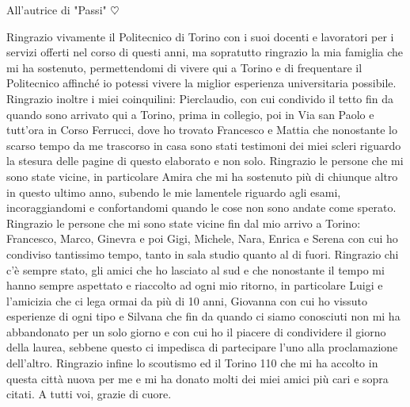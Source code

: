 \documentclass[%
	corpo=11pt,
    twoside,
    stile=classica,
    oldstyle,
    tipotesi=custom,
    greek,
    evenboxes,
]{toptesi}
\theoremstyle{plain}
\begin{document}


\ifclassica%
\begin{dedica}

    All'autrice di "Passi" $\heartsuit$\ %
\end{dedica}

\sommario%





\ringraziamenti%

Ringrazio vivamente il Politecnico di Torino con i suoi docenti e lavoratori per i servizi offerti nel corso di questi anni, ma sopratutto ringrazio la mia famiglia che mi ha sostenuto, permettendomi di vivere qui a Torino e di frequentare il Politecnico affinché io potessi vivere la miglior esperienza universitaria possibile.\\
Ringrazio inoltre i miei coinquilini: Pierclaudio, con cui condivido il tetto fin da quando sono arrivato qui a Torino, prima in collegio, poi in Via san Paolo e tutt'ora in Corso Ferrucci, dove ho trovato Francesco e Mattia che nonostante lo scarso tempo da me trascorso in casa sono stati testimoni dei miei scleri riguardo la stesura delle pagine di questo elaborato e non solo.
Ringrazio le persone che mi sono state vicine, in particolare Amira che mi ha sostenuto più di chiunque altro in questo ultimo anno, subendo le mie lamentele riguardo agli esami, incoraggiandomi e confortandomi quando le cose non sono andate come sperato. 
Ringrazio le persone che mi sono state vicine fin dal mio arrivo a Torino: Francesco, Marco, Ginevra e poi Gigi, Michele, Nara, Enrica e Serena con cui ho condiviso tantissimo tempo, tanto in sala studio quanto al di fuori.
Ringrazio chi c'è sempre stato, gli amici che ho lasciato al sud e che nonostante il tempo mi hanno sempre aspettato e riaccolto ad ogni mio ritorno, in particolare Luigi e l'amicizia che ci lega ormai da più di 10 anni, Giovanna con cui ho vissuto esperienze di ogni tipo e Silvana che fin da quando ci siamo conosciuti non mi ha abbandonato per un solo giorno e con cui ho il piacere di condividere il giorno della laurea, sebbene questo ci impedisca di partecipare l'uno alla proclamazione dell'altro.
Ringrazio infine lo scoutismo ed il Torino 110 che mi ha accolto in questa città nuova per me e mi ha donato molti dei miei amici più cari e sopra citati.
A tutti voi, grazie di cuore.
\end{document}
